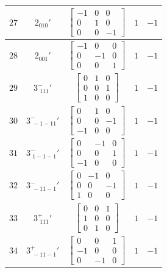 \documentclass[fleqn,8pt]{jsarticle}
\begin{document}
\begin{longtable}{ccccc}
$ 27 $ & $ 2{}_{010}{}' $ & $ \begin{bmatrix} -1 & 0 & 0 \\ 0 & 1 & 0 \\ 0 & 0 & -1 \end{bmatrix} $ & $ 1 $ & $ -1 $ \\ \hline
$ 28 $ & $ 2{}_{001}{}' $ & $ \begin{bmatrix} -1 & 0 & 0 \\ 0 & -1 & 0 \\ 0 & 0 & 1 \end{bmatrix} $ & $ 1 $ & $ -1 $ \\ \hline
$ 29 $ & $ 3^{-}_{\,\,111}{}' $ & $ \begin{bmatrix} 0 & 1 & 0 \\ 0 & 0 & 1 \\ 1 & 0 & 0 \end{bmatrix} $ & $ 1 $ & $ -1 $ \\ \hline
$ 30 $ & $ 3^{-}_{\,\,-1-11}{}' $ & $ \begin{bmatrix} 0 & 1 & 0 \\ 0 & 0 & -1 \\ -1 & 0 & 0 \end{bmatrix} $ & $ 1 $ & $ -1 $ \\ \hline
$ 31 $ & $ 3^{-}_{\,\,1-1-1}{}' $ & $ \begin{bmatrix} 0 & -1 & 0 \\ 0 & 0 & 1 \\ -1 & 0 & 0 \end{bmatrix} $ & $ 1 $ & $ -1 $ \\ \hline
$ 32 $ & $ 3^{-}_{\,\,-11-1}{}' $ & $ \begin{bmatrix} 0 & -1 & 0 \\ 0 & 0 & -1 \\ 1 & 0 & 0 \end{bmatrix} $ & $ 1 $ & $ -1 $ \\ \hline
$ 33 $ & $ 3^{+}_{\,\,111}{}' $ & $ \begin{bmatrix} 0 & 0 & 1 \\ 1 & 0 & 0 \\ 0 & 1 & 0 \end{bmatrix} $ & $ 1 $ & $ -1 $ \\ \hline
$ 34 $ & $ 3^{+}_{\,\,-11-1}{}' $ & $ \begin{bmatrix} 0 & 0 & 1 \\ -1 & 0 & 0 \\ 0 & -1 & 0 \end{bmatrix} $ & $ 1 $ & $ -1 $ \\ \hline

\end{longtable}
\end{document}

